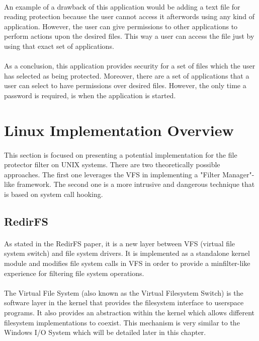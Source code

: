	\paragraph{}
	An example of a drawback of this application would be adding a text file for reading protection because the user cannot access it afterwords using any kind of application. However, the user can give permissions to other applications to perform actions upon the desired files. This way a user can access the file just by using that exact set of applications.
	
	\paragraph{}
	As a conclusion, this application provides security for a set of files which the user has selected as being protected. Moreover, there are a set of applications that a user can select to have permissions over desired files. However, the only time a password is required, is when the application is started. 
	
	\newpage
	\section{Linux Implementation Overview}
	\paragraph{}
	This section is focused on presenting a potential implementation for the file protector filter on UNIX systems. There are two theoretically possible approaches. The first one leverages the VFS in implementing a "Filter Manager"-like framework. The second one is a more intrusive and dangerous technique that is based on system call hooking. 
	
	\subsection{RedirFS}
	\paragraph{}
	As stated in the RedirFS paper, it is a new layer between VFS (virtual file system switch) and file system drivers\cite{RedirFS}. It is implemented as a standalone kernel module and modifies file system calls in VFS in order to provide a minfilter-like experience for filtering file system operations.
	
	\paragraph{}
	The Virtual File System (also known as the Virtual Filesystem Switch) is the software layer in the kernel that provides the filesystem interface to userspace programs. It also provides an abstraction
	within the kernel which allows different filesystem implementations to coexist\cite{KernelArchivesVFS}. This mechanism is very similar to the Windows I/O System which will be detailed later in this chapter.
	
